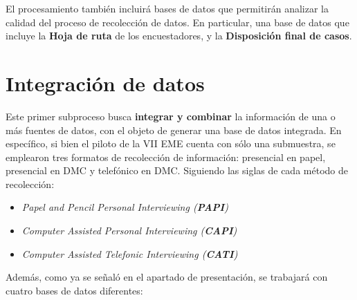 \documentclass[
]{article}
\providecommand{\tightlist}{%
  \setlength{\itemsep}{0pt}\setlength{\parskip}{0pt}}
\begin{document}
El procesamiento también incluirá bases de datos que permitirán analizar la calidad del proceso de recolección de datos. En particular, una base de datos que incluye la \textbf{Hoja de ruta} de los encuestadores, y la \textbf{Disposición final de casos}.

\newpage

\hypertarget{integraciuxf3n-de-datos}{%
\section{Integración de datos}\label{integraciuxf3n-de-datos}}

Este primer subproceso busca \textbf{integrar y combinar} la información de una o más fuentes de datos, con el objeto de generar una base de datos integrada. En específico, si bien el piloto de la VII EME cuenta con sólo una submuestra, se emplearon tres formatos de recolección de información: presencial en papel, presencial en DMC y telefónico en DMC. Siguiendo las siglas de cada método de recolección:

\begin{itemize}
\tightlist
\item
  \emph{Papel and Pencil Personal Interviewing (\textbf{PAPI})}
\item
  \emph{Computer Assisted Personal Interviewing (\textbf{CAPI})}
\item
  \emph{Computer Assisted Telefonic Interviewing (\textbf{CATI})}
\end{itemize}

Además, como ya se señaló en el apartado de presentación, se trabajará con cuatro bases de datos diferentes:
\end{document}
